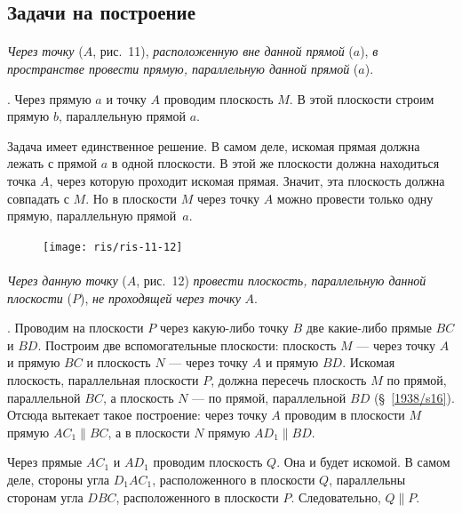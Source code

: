 \documentclass[twoside]{book}
\begin{document}
\subsection*{Задачи на построение}

\paragraph{}\label{1938/s19}
\emph{Через точку} ($A$, рис.~11), \emph{расположенную вне данной прямой} ($a$), \emph{в пространстве провести прямую, параллельную данной прямой} ($a$).

.
Через прямую $a$ и точку $A$ проводим плоскость $M$.
В этой плоскости строим прямую $b$, параллельную прямой $a$.

Задача имеет единственное решение.
В самом деле, искомая прямая должна лежать с прямой $a$ в одной плоскости.
В этой же плоскости должна находиться точка $A$, через которую проходит искомая прямая.
Значит, эта плоскость должна совпадать с $M$.
Но в плоскости $M$ через точку $A$ можно провести только одну прямую, параллельную прямой~$a$.

\begin{figure}[h!]
\centering
\texttt{[image: ris/ris-11-12]}
\caption{}
\end{figure}

\paragraph{}\label{1938/s20}
\emph{Через данную точку} ($A$, рис.~12) \emph{провести плоскость, параллельную данной плоскости} ($P$), \emph{не проходящей через точку} $A$.

.
Проводим на плоскости $P$ через какую-либо точку $B$ две какие-либо прямые $BC$ и $BD$.
Построим две вспомогательные плоскости: плоскость $M$ --- через точку $A$ и прямую $BC$ и плоскость $N$ --- через точку $A$ и прямую $BD$.
Искомая плоскость, параллельная плоскости $P$, должна пересечь плоскость $M$ по прямой, параллельной $BC$, а плоскость $N$ --- по прямой, параллельной $BD$ (§~\ref{1938/s16}).
Отсюда вытекает такое построение: через точку $A$ проводим в плоскости $M$ прямую $AC_1\parallel BC$, а в плоскости $N$ прямую $AD_1\parallel BD$.

Через прямые $AC_1$ и $AD_1$ проводим плоскость $Q$.
Она и будет искомой.
В самом деле, стороны угла $D_1AC_1$, расположенного в плоскости $Q$, параллельны сторонам угла $DBC$, расположенного в плоскости $P$.
Следовательно, $Q\parallel P$.
\end{document}
